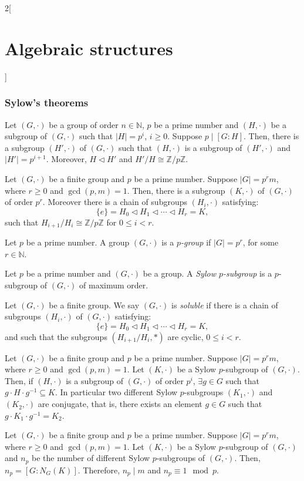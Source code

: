 \documentclass[class=article,10pt,crop=false]{standalone}
\begin{document}
\begin{multicols}{2}[\section{Algebraic structures}]
\subsubsection*{Sylow's theorems}
\begin{corollary}
Let $(G,\cdot)$ be a group of order $n\in\mathbb{N}$, $p$ be a prime number and $(H,\cdot)$ be a subgroup of $(G,\cdot)$ such that $|H|=p^i$, $i\geq 0$. Suppose $p\mid[G:H]$. Then, there is a subgroup $(H',\cdot)$ of $(G,\cdot)$ such that $(H,\cdot)$ is a subgroup of $(H',\cdot)$ and $|H'|=p^{i+1}$. Moreover, $H\lhd H'$ and $H'/H\cong\mathbb{Z}/p\mathbb{Z}$.
\end{corollary}
\begin{theorem}
Let $(G,\cdot)$ be a finite group and $p$ be a prime number. Suppose $|G|=p^r m$, where $r\geq 0$ and $\gcd(p,m)=1$. Then, there is a subgroup $(K,\cdot)$ of $(G,\cdot)$ of order $p^r$. Moreover there is a chain of subgroups $(H_i,\cdot)$ satisfying: $$\{e\}=H_0\lhd H_1\lhd\cdots\lhd H_r=K,$$ such that $H_{i+1}/H_i\cong\mathbb{Z}/p\mathbb{Z}$ for $0\leq i<r$.
\end{theorem}
\begin{definition}
Let $p$ be a prime number. A group $(G,\cdot)$ is a \textit{$p$-group} if $|G|=p^r$, for some $r\in\mathbb{N}$.
\end{definition}
\begin{definition}
Let $p$ be a prime number and $(G,\cdot)$ be a group. A \textit{Sylow $p$-subgroup} is a $p$-subgroup of $(G,\cdot)$ of maximum order.
\end{definition}
\begin{definition}
Let $(G,\cdot)$ be a finite group. We say $(G,\cdot)$ is \textit{soluble} if there is a chain of subgroups $(H_i,\cdot)$ of $(G,\cdot)$ satisfying: $$\{e\}=H_0\lhd H_1\lhd\cdots\lhd H_r=K,$$ and such that the subgroups $(H_{i+1}/H_i,*)$ are cyclic, $0\leq i<r$. 
\end{definition}
\begin{theorem}
Let $(G,\cdot)$ be a finite group and $p$ be a prime number. Suppose $|G|=p^r m$, where $r\geq 0$ and $\gcd(p,m)=1$. Let $(K,\cdot)$ be a Sylow $p$-subgroup of $(G,\cdot)$. Then, if $(H,\cdot)$ is a subgroup of $(G,\cdot)$ of order $p^i$, $\exists g\in G$ such that $g\cdot H\cdot g^{-1}\subseteq K$. In particular two different Sylow $p$-subgroups $(K_1,\cdot)$ and $(K_2,\cdot)$ are conjugate, that is, there exists an element $g\in G$ such that $g\cdot K_1\cdot g^{-1}=K_2$.
\end{theorem}
\begin{theorem}
Let $(G,\cdot)$ be a finite group and $p$ be a prime number. Suppose $|G|=p^r m$, where $r\geq 0$ and $\gcd(p,m)=1$. Let $(K,\cdot)$ be a Sylow $p$-subgroup of $(G,\cdot)$ and $n_p$ be the number of different Sylow $p$-subgroups of $(G,\cdot)$. Then, $n_p=[G:N_G(K)]$. Therefore, $n_p\mid m$ and $n_p\equiv1\mod p$. 
\end{theorem}

\end{multicols}
\end{document}
